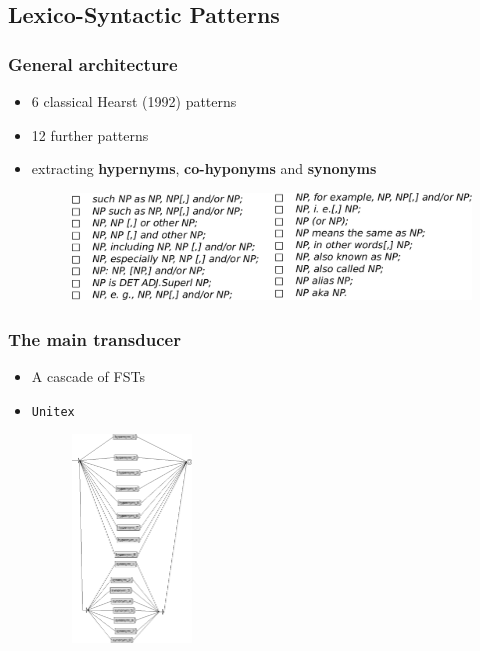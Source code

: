 \documentclass{beamer}
\begin{document}
\begin{frame}
\begin{itemize}
\begin{figure}
		\end{figure}
\end{itemize}

\end{frame}

\subsection{Lexico-Syntactic Patterns}

\begin{frame}
\frametitle{General architecture}

\begin{itemize}
  \item 6 classical Hearst (1992) patterns 
  \item 12 further patterns 
  \item extracting \textbf{hypernyms}, \textbf{co-hyponyms} and \textbf{synonyms}
\begin{figure}	
	\centering
		\includegraphics[width=1.0\textwidth]{figures/patterns}
	\end{figure}
\end{itemize}

\end{frame}

\begin{frame}
\frametitle{The main transducer}

\begin{itemize}
  \item A cascade of FSTs
  \item \texttt{Unitex}
\begin{figure}	
	\centering
		\includegraphics[width=0.3\textwidth]{figures/main-graph}
	\end{figure}
\end{itemize}

\end{frame}
\end{document}
